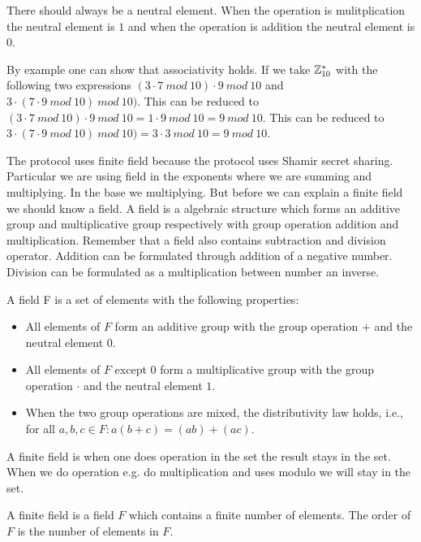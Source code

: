  There should always be a neutral element. When the operation is mulitplication the neutral element is $1$ and when the operation is addition the neutral element is $0$.

 By example one can show that associativity holds. If we take $ \mathbb{Z}_{10}^*$ with the following two expressions $ (3 \cdot 7 \ mod \ 10) \cdot 9 \ mod \ 10 $ and  $ 3 \cdot ( 7 \cdot 9 \ mod \ 10) \ mod \ 10) $. This can be reduced to $ (3 \cdot 7 \ mod \ 10) \cdot 9 \ mod \ 10 = 1 \cdot 9 \ mod \ 10 = 9 \ mod \ 10$. This can be reduced to $ 3 \cdot ( 7 \cdot 9 \ mod \ 10) \ mod \ 10) = 3 \cdot 3 \ mod \ 10 = 9 \ mod \ 10 $.


 The protocol uses finite field because the protocol uses Shamir secret sharing. Particular we are using field in the exponents where we are summing and multiplying. In the base we multiplying.  But before we can explain a finite field we should know a field. A field is a  algebraic structure which forms an additive group and multiplicative group  respectively with group operation addition and multiplication. Remember that a field also contains subtraction and division operator. Addition can be formulated through addition of a negative number. Division can be formulated as a multiplication between number an inverse.  
\begin{defi}
A field F is a set of elements with the following properties:
\begin{itemize}
\item  All elements of $F$ form an additive group with the group operation $+$ and the neutral element $0$.
\item  All elements of $F$ except $0$ form a multiplicative group with the group operation $ \cdot $ and the neutral element $1$.
\item When the two group operations are mixed, the distributivity law holds, i.e., for all $a,b,c \in F: a(b+c) = (ab)+(ac)$.
\end{itemize}
\end{defi}
 A finite field is when one does operation in the set the result stays in the set. When we do operation e.g. do multiplication and uses modulo we will stay in the set.
\begin{defi}
A finite field is a field $F$ which contains a finite number of elements. The order of $F$ is the number of elements in $F$.
\end{defi}

